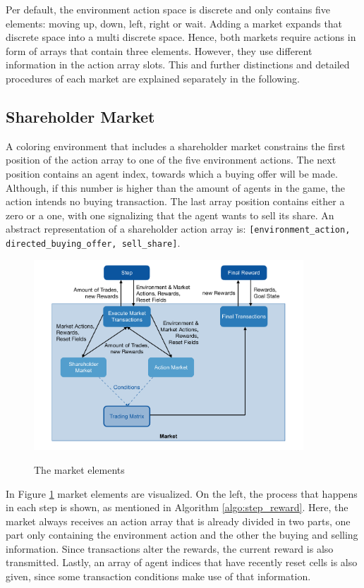 Per default, the environment action space is discrete and only contains five elements: moving up, down, left, right or wait. Adding a market expands that discrete space into a multi discrete space. Hence, both markets require actions in form of arrays that contain three elements. However, they use different information in the action array slots. This and further distinctions and detailed procedures of each market are explained separately in the following.


\subsection{Shareholder Market}
A coloring environment that includes a shareholder market constrains the first position of the action array to one of the five environment actions. The next position contains an agent index, towards which a buying offer will be made. Although, if this number is higher than the amount of agents in the game, the action intends no buying transaction. The last array position contains either a zero or a one, with one signalizing that the agent wants to sell its share. An abstract representation of a shareholder action array is: \verb|[environment_action, directed_buying_offer, sell_share]|.

\begin{figure}[hpbt]
    \centering
    \includegraphics[width=0.9\textwidth]{pictures/market}\\
    \caption[Market Elements]{The market elements}\label{fig:market}
\end{figure}

In Figure \ref{fig:market} market elements are visualized. On the left, the process that happens in each step is shown, as mentioned in Algorithm \ref{algo:step_reward}. Here, the market always receives an action array that is already divided in two parts, one part only containing the environment action and the other the buying and selling information. Since transactions alter the rewards, the current reward is also transmitted. Lastly, an array of agent indices that have recently reset cells is also given, since some transaction conditions make use of that information.

